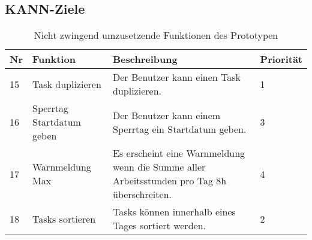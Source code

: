 \subsection{KANN-Ziele}
\begin{table}[!ht]
\begin{center}
    \begin{tabular}{llp{8cm}l}
        \toprule Nr & Funktion & Beschreibung & Priorität \\
        \midrule 15 & Task duplizieren & Der Benutzer kann einen Task duplizieren. & 1\\
        \midrule 16 & Sperrtag Startdatum geben & Der Benutzer kann einem Sperrtag ein Startdatum geben. &  3\\ 
        \midrule 17 & Warnmeldung Max & Es erscheint eine Warnmeldung wenn die Summe aller Arbeitsstunden pro Tag 8h überschreiten. & 4\\
        \midrule 18 & Tasks sortieren & Tasks können innerhalb eines Tages sortiert werden. & 2\\
        \bottomrule
    \end{tabular}
    \caption{Nicht zwingend umzusetzende Funktionen des Prototypen}
    \label{tab:kann_funktionen}
\end{center}
\end{table}

% 
